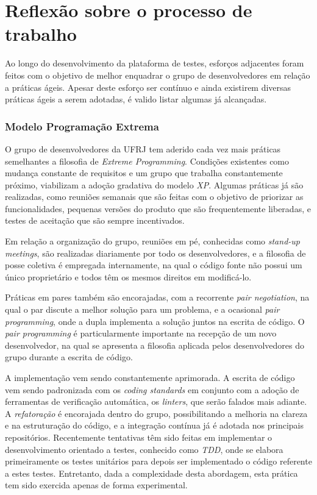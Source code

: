 \hypertarget{implementacao-de-praticas-ageis}{%
\section{Reflexão sobre o processo de trabalho}\label{implementacao-de-praticas-ageis}}

Ao longo do desenvolvimento da plataforma de testes, esforços adjacentes foram feitos com o objetivo de melhor enquadrar o grupo de desenvolvedores em relação a práticas ágeis. Apesar deste esforço ser contínuo e ainda existirem diversas práticas ágeis a serem adotadas, é valido listar algumas já alcançadas.

\hypertarget{modelo-extreme-programming}{%
\label{modelo-extreme-programming}}
\subsubsection{Modelo Programação Extrema}

O grupo de desenvolvedores da UFRJ tem aderido cada vez mais práticas semelhantes a filosofia de \emph{Extreme Programming}. Condições existentes como mudança constante de requisitos e um grupo que trabalha constantemente próximo, viabilizam a adoção gradativa do modelo \emph{XP}. Algumas práticas já são realizadas, como reuniões semanais que são feitas com o objetivo de priorizar as funcionalidades, pequenas versões do produto que são frequentemente liberadas, e testes de aceitação que são sempre incentivados.

Em relação a organização do grupo, reuniões em pé, conhecidas como \emph{stand-up meetings}, são realizadas diariamente por todo os desenvolvedores, e a filosofia de posse coletiva é empregada internamente, na qual o código fonte não possui um único proprietário e todos têm os mesmos direitos em modificá-lo.

Práticas em pares também são encorajadas, com a recorrente \emph{pair negotiation}, na qual o par discute a melhor solução para um problema, e a ocasional \emph{pair programming}, onde a dupla implementa a solução juntos na escrita de código. O \emph{pair programming} é particularmente importante na recepção de um novo desenvolvedor, na qual se apresenta a filosofia aplicada pelos desenvolvedores do grupo durante a escrita de código.

A implementação vem sendo constantemente aprimorada. A escrita de código vem sendo padronizada com os \emph{coding standards} em conjunto com a adoção de ferramentas de verificação automática, os \emph{linters}, que serão falados mais adiante. A \emph{refatoração} é encorajada dentro do grupo, possibilitando a melhoria na clareza e na estruturação do código, e a integração contínua já é adotada nos principais repositórios. Recentemente tentativas têm sido feitas em implementar o desenvolvimento orientado a testes, conhecido como \emph{TDD}, onde se elabora primeiramente os testes unitários para depois ser implementado o código referente a estes testes. Entretanto, dada a complexidade desta abordagem, esta prática tem sido exercida apenas de forma experimental.

